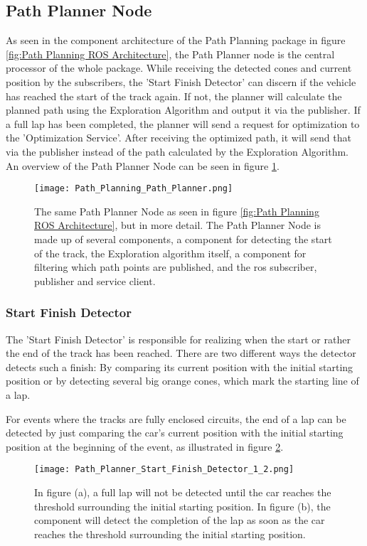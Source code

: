 \subsection{Path Planner Node} \label{sec:Path Planner Node}
As seen in the component architecture of the Path Planning package in figure \ref{fig:Path Planning ROS Architecture}, the Path Planner node is the central processor of the whole package.
While receiving the detected cones and current position by the subscribers, the 'Start Finish Detector' can discern if the vehicle has reached the start of the track again. If not, the planner will calculate the planned path using the Exploration Algorithm and output it via the publisher. If a full lap has been completed, the planner will send a request for optimization to the 'Optimization Service'. After receiving the optimized path, it will send that via the publisher instead of the path calculated by the Exploration Algorithm. An overview of the Path Planner Node can be seen in figure \ref{fig:Path Planning Path Planner Node}.
\begin{figure}[H]
    \centering
    \texttt{[image: Path\_Planning\_Path\_Planner.png]}
    \caption{The same Path Planner Node as seen in figure \ref{fig:Path Planning ROS Architecture}, but in more detail. The Path Planner Node is made up of several components, a component for detecting the start of the track, the Exploration algorithm itself, a component for filtering which path points are published, and the \acrshort{ros} subscriber, publisher and service client.}
    \label{fig:Path Planning Path Planner Node}
\end{figure}

\subsubsection{Start Finish Detector} \label{sec:Start Finish Detector} %
The 'Start Finish Detector' is responsible for realizing when the start or rather the end of the track has been reached. There are two different ways the detector detects such a finish: By comparing its current position with the initial starting position or by detecting several big orange cones, which mark the starting line of a lap.

For events where the tracks are fully enclosed circuits, the end of a lap can be detected by just comparing the car's current position with the initial starting position at the beginning of the event, as illustrated in figure \ref{fig:Path Planner Start Finish Detector 1 and 2}.
\begin{figure}[H]
    \centering
    \texttt{[image: Path\_Planner\_Start\_Finish\_Detector\_1\_2.png]}
    \caption{In figure (a), a full lap will not be detected until the car reaches the threshold surrounding the initial starting position. In figure (b), the component will detect the completion of the lap as soon as the car reaches the threshold surrounding the initial starting position.}
    \label{fig:Path Planner Start Finish Detector 1 and 2}
\end{figure}

